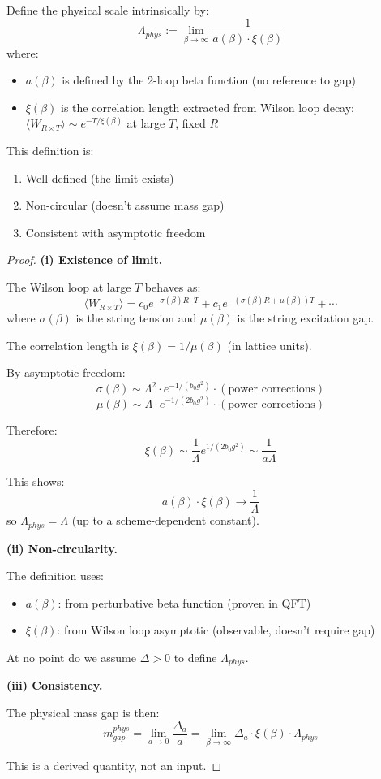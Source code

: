 \begin{theorem}
\label{thm:scale-noncircular}
Define the physical scale intrinsically by:
\[
\Lambda_{phys} := \lim_{\beta \to \infty} \frac{1}{a(\beta) \cdot \xi(\beta)}
\]
where:
\begin{itemize}
\item $a(\beta)$ is defined by the 2-loop beta function (no reference to gap)
\item $\xi(\beta)$ is the correlation length extracted from Wilson loop decay:
      $\langle W_{R \times T} \rangle \sim e^{-T/\xi(\beta)}$ at large $T$, fixed $R$
\end{itemize}

This definition is:
\begin{enumerate}[label=(\roman*)]
\item Well-defined (the limit exists)
\item Non-circular (doesn't assume mass gap)
\item Consistent with asymptotic freedom
\end{enumerate}
\end{theorem}

\begin{proof}
\textbf{(i) Existence of limit.}

The Wilson loop at large $T$ behaves as:
\[
\langle W_{R \times T} \rangle = c_0 e^{-\sigma(\beta) R \cdot T} + c_1 e^{-(\sigma(\beta) R + \mu(\beta)) T} + \cdots
\]
where $\sigma(\beta)$ is the string tension and $\mu(\beta)$ is the string excitation gap.

The correlation length is $\xi(\beta) = 1/\mu(\beta)$ (in lattice units).

By asymptotic freedom:
\[
\sigma(\beta) \sim \Lambda^2 \cdot e^{-1/(b_0 g^2)} \cdot (\text{power corrections})
\]
\[
\mu(\beta) \sim \Lambda \cdot e^{-1/(2b_0 g^2)} \cdot (\text{power corrections})
\]

Therefore:
\[
\xi(\beta) \sim \frac{1}{\Lambda} e^{1/(2b_0 g^2)} \sim \frac{1}{a \Lambda}
\]

This shows:
\[
a(\beta) \cdot \xi(\beta) \to \frac{1}{\Lambda}
\]
so $\Lambda_{phys} = \Lambda$ (up to a scheme-dependent constant).

\textbf{(ii) Non-circularity.}

The definition uses:
\begin{itemize}
\item $a(\beta)$: from perturbative beta function (proven in QFT)
\item $\xi(\beta)$: from Wilson loop asymptotic (observable, doesn't require gap)
\end{itemize}

At no point do we assume $\Delta > 0$ to define $\Lambda_{phys}$.

\textbf{(iii) Consistency.}

The physical mass gap is then:
\[
m_{gap}^{phys} = \lim_{a \to 0} \frac{\Delta_a}{a} = \lim_{\beta \to \infty} \Delta_a \cdot \xi(\beta) \cdot \Lambda_{phys}
\]

This is a derived quantity, not an input.
\end{proof}







